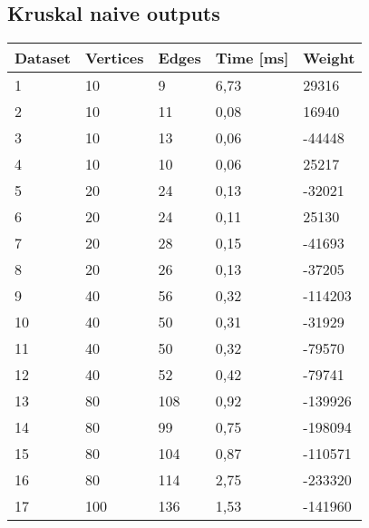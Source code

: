 \subsection{Kruskal naive outputs}
\begin{longtable}{lllll}
    \textbf{Dataset} & \textbf{Vertices} & \textbf{Edges} & \textbf{Time [ms]} & \textbf{Weight} \\
    \endhead
    1                & 10             & 9              & 6,73        & 29316           \\
    2                & 10             & 11             & 0,08        & 16940           \\
    3                & 10             & 13             & 0,06        & -44448          \\
    4                & 10             & 10             & 0,06        & 25217           \\
    5                & 20             & 24             & 0,13        & -32021          \\
    6                & 20             & 24             & 0,11        & 25130           \\
    7                & 20             & 28             & 0,15        & -41693          \\
    8                & 20             & 26             & 0,13        & -37205          \\
    9                & 40             & 56             & 0,32        & -114203         \\
    10               & 40             & 50             & 0,31        & -31929          \\
    11               & 40             & 50             & 0,32        & -79570          \\
    12               & 40             & 52             & 0,42        & -79741          \\
    13               & 80             & 108            & 0,92        & -139926         \\
    14               & 80             & 99             & 0,75        & -198094         \\
    15               & 80             & 104            & 0,87        & -110571         \\
    16               & 80             & 114            & 2,75        & -233320         \\
    17               & 100            & 136            & 1,53        & -141960         \\

\end{longtable}
